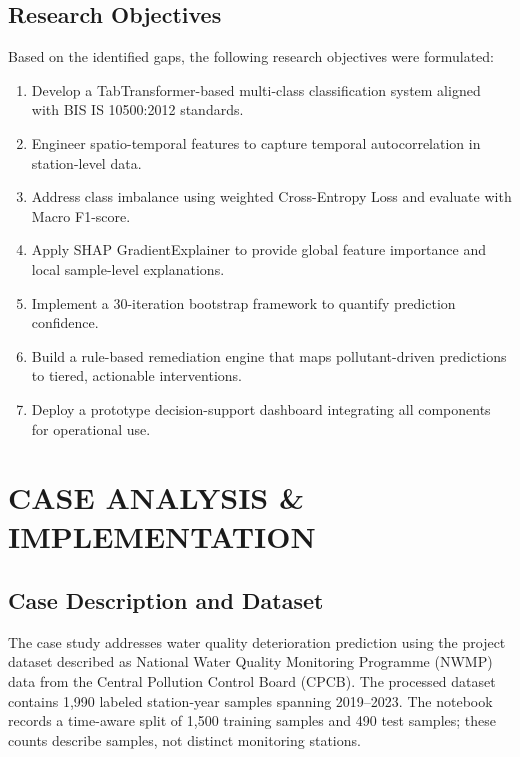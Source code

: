 \documentclass[12pt,a4paper]{report}
\numberwithin{table}{chapter}
\numberwithin{figure}{chapter}
\begin{document}
\section{Research Objectives}

Based on the identified gaps, the following research objectives were formulated:

\begin{enumerate}[leftmargin=1.5cm,itemsep=0pt,topsep=0pt,parsep=0pt]
  \item Develop a TabTransformer-based multi-class classification system aligned with BIS IS 10500:2012 standards.
  \item Engineer spatio-temporal features to capture temporal autocorrelation in station-level data.
  \item Address class imbalance using weighted Cross-Entropy Loss and evaluate with Macro F1-score.
  \item Apply SHAP GradientExplainer to provide global feature importance and local sample-level explanations.
  \item Implement a 30-iteration bootstrap framework to quantify prediction confidence.
  \item Build a rule-based remediation engine that maps pollutant-driven predictions to tiered, actionable interventions.
  \item Deploy a prototype decision-support dashboard integrating all components for operational use.
\end{enumerate}

\chapter{CASE ANALYSIS \& IMPLEMENTATION}
\label{ch:case-analysis}

\section{Case Description and Dataset}

The case study addresses water quality deterioration prediction using the project
dataset described as National Water Quality Monitoring Programme (NWMP) data from the
Central Pollution Control Board (CPCB). The processed dataset contains 1,990 labeled
station-year samples spanning 2019--2023. The notebook records a time-aware split of
1,500 training samples and 490 test samples; these counts describe samples, not distinct
monitoring stations.
\end{document}
